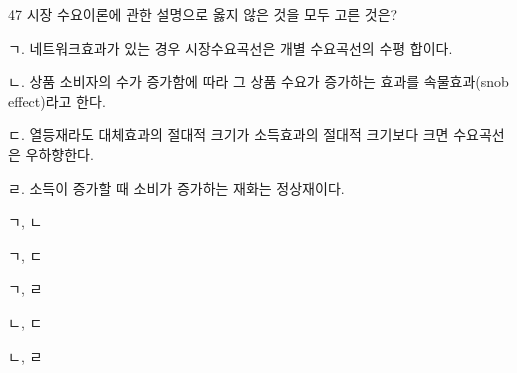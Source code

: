 \begin{question}{47}
시장 수요이론에 관한 설명으로 옳지 않은 것을 모두 고른 것은?
\begin{framedtext}
ㄱ. 네트워크효과가 있는 경우 시장수요곡선은 개별 수요곡선의 수평 합이다. \par
ㄴ. 상품 소비자의 수가 증가함에 따라 그 상품 수요가 증가하는 효과를 속물효과(snob effect)라고 한다. \par
ㄷ. 열등재라도 대체효과의 절대적 크기가 소득효과의 절대적 크기보다 크면 수요곡선은 우하향한다. \par
ㄹ. 소득이 증가할 때 소비가 증가하는 재화는 정상재이다. \par
\end{framedtext}
\begin{choices}
  \item ㄱ, ㄴ
  \item ㄱ, ㄷ
  \item ㄱ, ㄹ
  \item ㄴ, ㄷ
  \item ㄴ, ㄹ
\end{choices}
\end{question}
